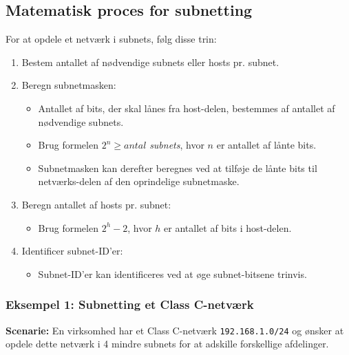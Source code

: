 \subsection{Matematisk proces for subnetting}
For at opdele et netværk i subnets, følg disse trin:
\begin{enumerate}
	\item Bestem antallet af nødvendige subnets eller hosts pr. subnet.
	\item Beregn subnetmasken:
	\begin{itemize}
		\item Antallet af bits, der skal lånes fra host-delen, bestemmes af antallet af nødvendige subnets.
		\item Brug formelen \(2^n \geq antal\) \textit{subnets}, hvor \(n\) er antallet af lånte bits.
		\item Subnetmasken kan derefter beregnes ved at tilføje de lånte bits til netværks-delen af den oprindelige subnetmaske.
	\end{itemize}
	\item Beregn antallet af hosts pr. subnet:
	\begin{itemize}
		\item Brug formelen \(2^h - 2\), hvor \(h\) er antallet af bits i host-delen.
	\end{itemize}
	\item Identificer subnet-ID'er:
	\begin{itemize}
		\item Subnet-ID'er kan identificeres ved at øge subnet-bitsene trinvis.
	\end{itemize}
\end{enumerate}

\subsubsection{Eksempel 1: Subnetting et Class C-netværk}
\textbf{Scenarie:} En virksomhed har et Class C-netværk \texttt{192.168.1.0/24} og ønsker at opdele dette netværk i 4 mindre subnets for at adskille forskellige afdelinger.

